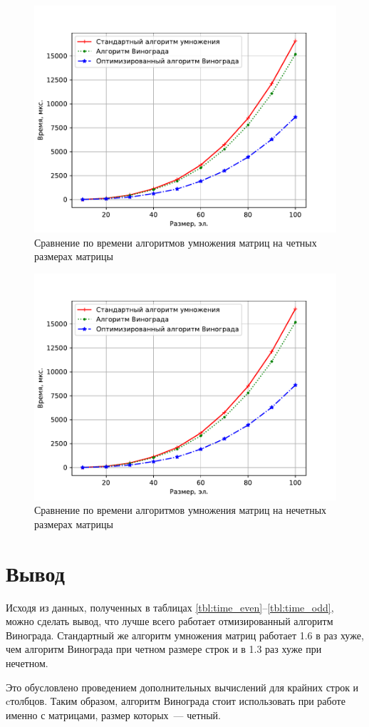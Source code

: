 \begin{figure}[H]
	\centering
	\includegraphics[height=0.4\textheight, page=1]{img/figures.pdf}
	\caption{Сравнение по времени алгоритмов умножения матриц на четных размерах матрицы}
	\label{plt:time_01}
\end{figure}

\begin{figure}[H]
	\centering
	\includegraphics[height=0.4\textheight, page=2]{img/figures.pdf}
	\caption{Сравнение по времени алгоритмов умножения матриц на нечетных размерах матрицы}
	\label{plt:time_02}
\end{figure}

\section*{Вывод}
Исходя из данных, полученных в таблицах \ref{tbl:time_even}--\ref{tbl:time_odd}, можно сделать вывод, что лучше всего работает отмизированный алгоритм Винограда.
Стандартный же алгоритм умножения матриц работает 1.6 в раз хуже, чем алгоритм Винограда при четном размере строк и в 1.3 раз хуже при нечетном.

Это обусловлено проведением дополнительных вычислений для крайних строк и cтолбцов. Таким образом, алгоритм Винограда стоит использовать при работе именно с матрицами, размер которых~--- четный.
